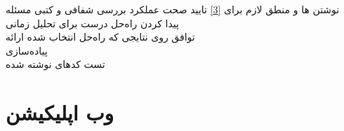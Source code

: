 \begin{wbsbox}{}
\begin{wbssub}
{نوشتن ها و منطق لازم برای \ref{3}}
{تایید صحت عملکرد}
\task 
بررسی شفافی و کتبی مسئله \\
\task
پیدا کردن راه‌حل درست برای تحلیل زمانی \\
\task
توافق روی نتایجی که راه‌حل انتخاب شده ارائه \\
\task
پیاده‌سازی \\
\task
تست کد‌‌های نوشته شده
\end{wbssub}

\end{wbsbox}

\section{وب اپلیکیشن}